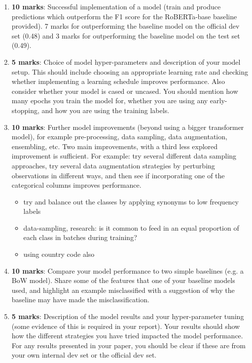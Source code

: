 \documentclass[11pt]{article}
\begin{document}
\begin{enumerate}
    \item \textbf{10 marks}: Successful implementation of a model (train and produce predictions which outperform the F1 score for the RoBERTa-base baseline provided). 7 marks for outperforming the baseline model on the official dev set (0.48) and 3 marks for outperforming the baseline model on the test set (0.49).
    \item \textbf{5 marks}: Choice of model hyper-parameters and description of your model setup. This should include choosing an appropriate learning rate and checking whether implementing a learning schedule improves performance. Also consider whether your model is cased or uncased. You should mention how many epochs you train the model for, whether you are using any early-stopping, and how you are using the training labels.
    \item \textbf{10 marks}: Further model improvements (beyond using a bigger transformer model), for example pre-processing, data sampling, data augmentation, ensembling, etc. Two main improvements, with a third less explored improvement is sufficient. For example: try several different data sampling approaches, try several data augmentation strategies by perturbing observations in different ways, and then see if incorporating one of the categorical columns improves performance.
    \begin{warning}
        \begin{itemize}
            \item try and balance out the classes by applying synonyms to low frequency labels
            \item data-sampling, research: is it common to feed in an equal proportion of each class in batches during training?
            \item using country code also
        \end{itemize}
    \end{warning}
    \item \textbf{10 marks}: Compare your model performance to two simple baselines (e.g. a BoW model). Share some of the features that one of your baseline models used, and highlight an example misclassified with a suggestion of why the baseline may have made the misclassification.
    \item \textbf{5 marks}: Description of the model results and your hyper-parameter tuning (some evidence of this is required in your report). Your results should show how the different strategies you have tried impacted the model performance. For any results presented in your paper, you should be clear if these are from your own internal dev set or the official dev set.
\end{enumerate}
\end{document}
